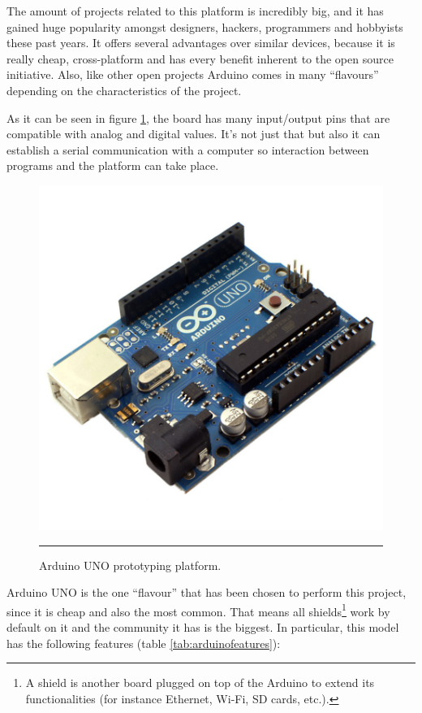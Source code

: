 The amount of projects related to this platform is incredibly big, and it has gained huge popularity amongst designers, hackers, programmers and hobbyists these past years. It offers several advantages over similar devices, because it is really cheap, cross-platform and has every benefit inherent to the open source initiative. Also, like other open projects Arduino comes in many ``flavours'' depending on the characteristics of the project.

As it can be seen in figure \ref{fig:ArduinoUNO}, the board has many input/output pins that are compatible with analog and digital values. It's not just that but also it can establish a serial communication with a computer so interaction between programs and the platform can take place.


\begin{figure}[htbp]
    \centering
    \includegraphics[scale=0.2]{./Figures/auno.jpg}
        \rule{35em}{0.5pt}
        \caption[Arduino UNO]{Arduino UNO prototyping platform.}
    \label{fig:ArduinoUNO}
\end{figure}

Arduino UNO is the one ``flavour'' that has been chosen to perform this project, since it is cheap and also the most common. That means all shields\footnote{A shield is another board plugged on top of the Arduino to extend its functionalities (for instance Ethernet, Wi-Fi, SD cards, etc.).}  work by default on it and the community it has is the biggest. In particular, this model has the following features (table \ref{tab:arduinofeatures}):
\\

